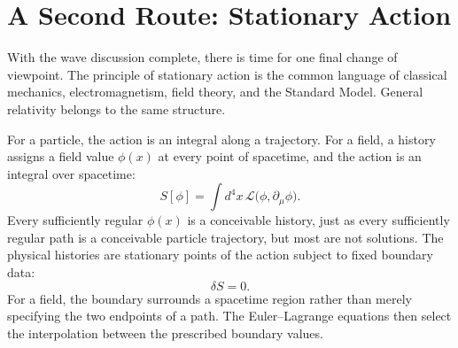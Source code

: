 \begin{classroomqa}
\end{classroomqa}

\begin{classroomqa}
\end{classroomqa}

\section{A Second Route: Stationary Action}

With the wave discussion complete, there is time for one final change of
viewpoint. The principle of stationary action is the common language of
classical mechanics, electromagnetism, field theory, and the Standard Model.
General relativity belongs to the same structure.

For a particle, the action is an integral along a trajectory. For a field,
a history assigns a field value \(\phi(x)\) at every point of spacetime, and
the action is an integral over spacetime:
\begin{equation}
 S[\phi]
 =\int d^4x\,
 \mathcal L\bigl(\phi,\partial_\mu\phi\bigr).
 \label{eq:field-action}
\end{equation}
Every sufficiently regular \(\phi(x)\) is a conceivable history, just as
every sufficiently regular path is a conceivable particle trajectory, but
most are not solutions. The physical histories are stationary points of
the action subject to fixed boundary data:
\begin{equation}
 \delta S=0.
 \label{eq:stationary-action}
\end{equation}
For a field, the boundary surrounds a spacetime region rather than merely
specifying the two endpoints of a path. The Euler--Lagrange equations then
select the interpolation between the prescribed boundary values.

